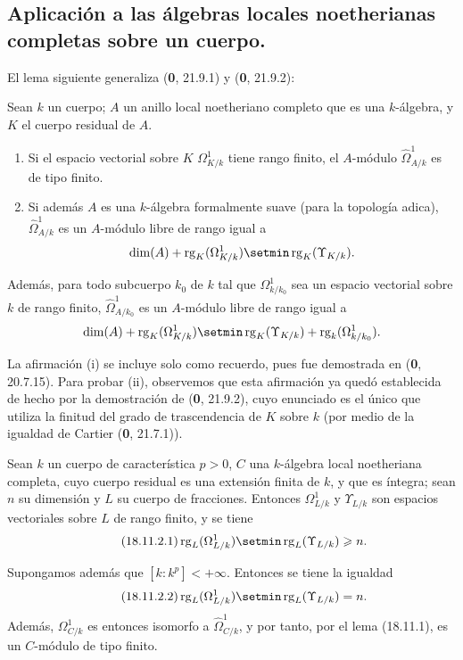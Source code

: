 \subsection{Aplicación a las álgebras locales noetherianas completas sobre un cuerpo.}
\label{subsection:IV.18.11}

El lema siguiente generaliza (\textbf 0, 21.9.1) y (\textbf 0, 21.9.2):

\begin{lemma}[18.11.1]
\label{IV.18.11.1}
Sean $k$ un cuerpo; $A$ un anillo local noetheriano completo que es una $k$-álgebra, y $K$ el cuerpo residual de $A$.
\begin{enumerate}
  \item[\textup{(i)}] Si el espacio vectorial sobre $K$ $\Omega^1_{K/k}$ tiene rango finito, el $A$-módulo $\hat{\Omega}^1_{A/k}$ es de tipo finito.
  \item[\textup{(ii)}] Si además $A$ es una $k$-álgebra formalmente suave (para la topología adica), $\hat{\Omega}^1_{A/k}$ es un $A$-módulo libre de rango igual a
\[
    \dim(A)+\operatorname{rg}_K(\Omega^1_{K/k})\setmin\operatorname{rg}_K(\Upsilon_{K/k}).
\]
\end{enumerate}
Además, para todo subcuerpo $k_0$ de $k$ tal que $\Omega^1_{k/k_0}$ sea un espacio vectorial sobre $k$ de rango finito, $\hat{\Omega}^1_{A/k_0}$ es un $A$-módulo libre de rango igual a
\[
  \dim(A)+\operatorname{rg}_K(\Omega^1_{K/k})\setmin\operatorname{rg}_K(\Upsilon_{K/k})+\operatorname{rg}_k(\Omega^1_{k/k_0}).
\]
\end{lemma}

La afirmación (i) se incluye solo como recuerdo, pues fue demostrada en (\textbf 0, 20.7.15). Para probar (ii), observemos que esta afirmación ya quedó establecida de hecho por la demostración de (\textbf 0, 21.9.2), cuyo enunciado es el único que utiliza la finitud del grado de trascendencia de $K$ sobre $k$ (por medio de la igualdad de Cartier (\textbf 0, 21.7.1)).

\begin{lemma}[18.11.2]
\label{IV.18.11.2}
Sean $k$ un cuerpo de característica $p>0$, $C$ una $k$-álgebra local noetheriana completa, cuyo cuerpo residual es una extensión finita de $k$, y que es íntegra; sean $n$ su dimensión y $L$ su cuerpo de fracciones. Entonces $\Omega^1_{L/k}$ y $\Upsilon_{L/k}$ son espacios vectoriales sobre $L$ de rango finito, y se tiene
\begin{equation}
\label{IV.18.11.2.1}
\tag{18.11.2.1}
  \operatorname{rg}_L(\Omega^1_{L/k})\setmin\operatorname{rg}_L(\Upsilon_{L/k})\geq n.
\end{equation}


Supongamos además que $[k:k^p]<+\infty$. Entonces se tiene la igualdad
\begin{equation}
\label{IV.18.11.2.2}
\tag{18.11.2.2}
  \operatorname{rg}_L(\Omega^1_{L/k})\setmin\operatorname{rg}_L(\Upsilon_{L/k})=n.
\end{equation}
Además, $\Omega^1_{C/k}$ es entonces isomorfo a $\hat{\Omega}^1_{C/k}$, y por tanto, por el lema \textup{(18.11.1)}, es un $C$-módulo de tipo finito.
\end{lemma}


